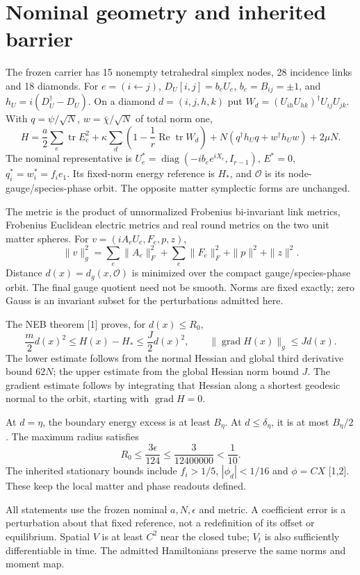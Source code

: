 \documentclass[11pt,a4paper]{article}
\newcommand{\tr}{\operatorname{tr}}\newcommand{\diag}{\operatorname{diag}}\newcommand{\Rea}{\operatorname{Re}}\newcommand{\id}{\mathbf1}\newcommand{\grad}{\operatorname{grad}}
\begin{document}
\section{Nominal geometry and inherited barrier}
The frozen carrier has 15 nonempty tetrahedral simplex nodes, 28 incidence links and 18 diamonds. For $e=(i\leftarrow j)$, $D_U[i,j]=b_eU_e$, $b_e=B_{ij}=\pm1$, and $h_U=i(D_U^\dagger-D_U)$. On a diamond $d=(i,j,h,k)$ put $W_d=(U_{ih}U_{hk})^\dagger U_{ij}U_{jk}$. With $q=\psi/\sqrt N$, $w=\bar\chi/\sqrt N$ of total norm one,
\[
H=\frac a2\sum_e\tr E_e^2+\kappa\sum_d\left(1-\frac1r\Rea\tr W_d\right)
+N(q^\dagger h_Uq+w^\dagger h_Uw)+2\mu N.
\]
The nominal representative is $U_e^*=\diag(-ib_ee^{iX_e},I_{r-1})$, $E^*=0$, $q_i^*=w_i^*=f_ie_1$. Its fixed-norm energy reference is $H_*$, and $\mathcal O$ is its node-gauge/species-phase orbit. The opposite matter symplectic forms are unchanged.

The metric is the product of unnormalized Frobenius bi-invariant link metrics, Frobenius Euclidean electric metrics and real round metrics on the two unit matter spheres. For $v=(iA_eU_e,F_e,p,z)$,
\[
\|v\|_g^2=\sum_e\|A_e\|_F^2+\sum_e\|F_e\|_F^2+\|p\|^2+\|z\|^2.
\]
Distance $d(x)=d_g(x,\mathcal O)$ is minimized over the compact gauge/species-phase orbit. The final gauge quotient need not be smooth. Norms are fixed exactly; zero Gauss is an invariant subset for the perturbations admitted here.

The NEB theorem [1] proves, for $d(x)\le R_0$,
\begin{equation}\label{eq:base}
\frac m2d(x)^2\le H(x)-H_*\le\frac J2d(x)^2,
\qquad \|\grad H(x)\|_g\le Jd(x).
\end{equation}
The lower estimate follows from the normal Hessian and global third derivative bound $62N$; the upper estimate from the global Hessian norm bound $J$. The gradient estimate follows by integrating that Hessian along a shortest geodesic normal to the orbit, starting with $\grad H=0$.

At $d=\eta$, the boundary energy excess is at least $B_\eta$. At $d\le\delta_\eta$, it is at most $B_\eta/2$. The maximum radius satisfies
\[
R_0\le\frac{3\epsilon}{124}\le\frac3{12400000}<\frac1{10}.
\]
The inherited stationary bounds include $f_i>1/5$, $|\phi_d|<1/16$ and $\phi=CX$ [1,2]. These keep the local matter and phase readouts defined.

All statements use the frozen nominal $a,N,\epsilon$ and metric. A coefficient error is a perturbation about that fixed reference, not a redefinition of its offset or equilibrium. Spatial $V$ is at least $C^2$ near the closed tube; $V_t$ is also sufficiently differentiable in time. The admitted Hamiltonians preserve the same norms and moment map.
\newpage
\end{document}

